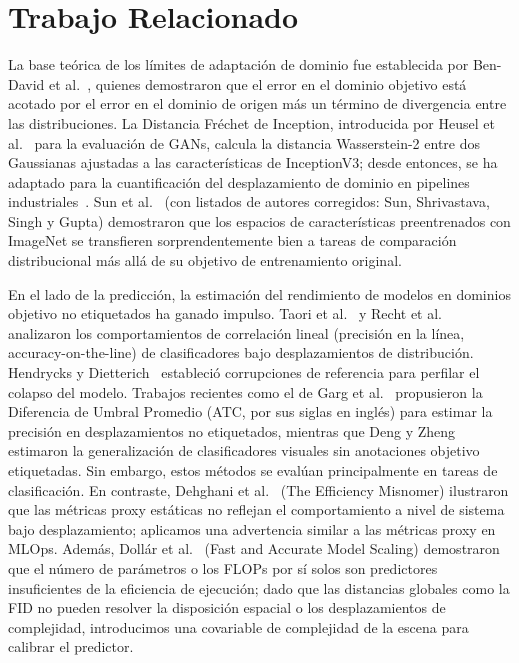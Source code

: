 \documentclass[10pt,twocolumn,letterpaper]{article}
\begin{document}
\section{Trabajo Relacionado}
La base teórica de los límites de adaptación de dominio fue establecida por Ben-David et al.~\cite{bendavid2010theory}, quienes demostraron que el error en el dominio objetivo está acotado por el error en el dominio de origen más un término de divergencia entre las distribuciones. La Distancia Fr\'echet de Inception, introducida por Heusel et al.~\cite{heusel2017gans} para la evaluación de GANs, calcula la distancia Wasserstein-2 entre dos Gaussianas ajustadas a las características de InceptionV3; desde entonces, se ha adaptado para la cuantificación del desplazamiento de dominio en pipelines industriales~\cite{wyoloservice2,invoker2026}. Sun et al.~\cite{sun2017revisiting} (con listados de autores corregidos: Sun, Shrivastava, Singh y Gupta) demostraron que los espacios de características preentrenados con ImageNet se transfieren sorprendentemente bien a tareas de comparación distribucional más allá de su objetivo de entrenamiento original.

En el lado de la predicción, la estimación del rendimiento de modelos en dominios objetivo no etiquetados ha ganado impulso. Taori et al.~\cite{taori2020measuring} y Recht et al.~\cite{recht2019imagenet} analizaron los comportamientos de correlación lineal (precisión en la línea, accuracy-on-the-line) de clasificadores bajo desplazamientos de distribución. Hendrycks y Dietterich~\cite{hendrycks2019benchmarking} estableció corrupciones de referencia para perfilar el colapso del modelo. Trabajos recientes como el de Garg et al.~\cite{garg2022leveraging} propusieron la Diferencia de Umbral Promedio (ATC, por sus siglas en inglés) para estimar la precisión en desplazamientos no etiquetados, mientras que Deng y Zheng~\cite{deng2021classifier} estimaron la generalización de clasificadores visuales sin anotaciones objetivo etiquetadas. Sin embargo, estos métodos se evalúan principalmente en tareas de clasificación. En contraste, Dehghani et al.~\cite{dehghani2021efficiency} (The Efficiency Misnomer) ilustraron que las métricas proxy estáticas no reflejan el comportamiento a nivel de sistema bajo desplazamiento; aplicamos una advertencia similar a las métricas proxy en MLOps. Además, Doll\'ar et al.~\cite{dollar2021scaling} (Fast and Accurate Model Scaling) demostraron que el número de parámetros o los FLOPs por sí solos son predictores insuficientes de la eficiencia de ejecución; dado que las distancias globales como la FID no pueden resolver la disposición espacial o los desplazamientos de complejidad, introducimos una covariable de complejidad de la escena para calibrar el predictor.
\end{document}
